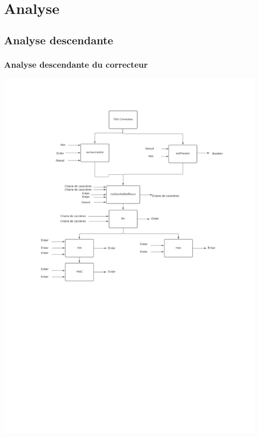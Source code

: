 \documentclass[11pt,a4paper]{article}
\begin{document}
     
    \section{Analyse}
        \subsection{Analyse descendante}
            \subsubsection{Analyse descendante du correcteur}
            \includegraphics{images/Analyse_Descendante_Correcteur.png}
            \clearpage
\end{document}

